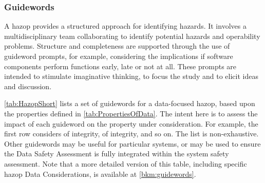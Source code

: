 \subsubsection{ Guidewords}
\label{bkm:HazopGuidewords}
A \gls{hazop} \cite{citation:iec61882:2016}
provides a structured approach for identifying hazards. It involves a multidisciplinary team collaborating to identify potential hazards and operability problems. Structure and \gls{completeness} are supported through the use of guideword prompts, for example, considering the implications if software components perform functions early, late or not at all. These prompts are intended to stimulate imaginative thinking, to focus the study and to elicit ideas and discussion.

\autoref{tab:HazopShort} lists a set of guidewords for a data-focused \gls{hazop}, based upon the properties defined in \autoref{tab:PropertiesOfData}. The intent here is to assess the impact of each guideword on the property under consideration. For example, the first row considers  of \gls{integrity},  of \gls{integrity}, and so on.
The list is non-exhaustive. Other guidewords may be useful for particular systems, or may be used to ensure the Data Safety Assessment is fully integrated within the system safety assessment. Note that a more detailed version of this table, including specific \gls{hazop} Data Considerations, is available at \autoref{bkm:guidewords}.

